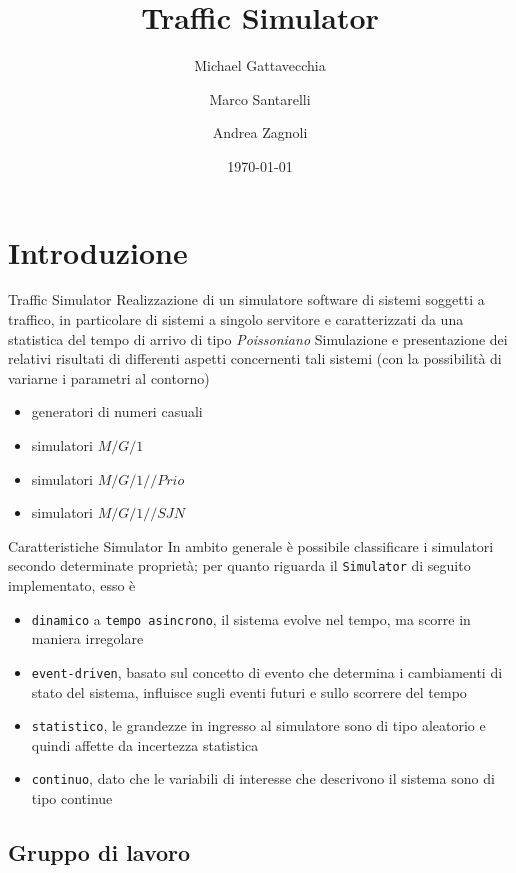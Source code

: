 \documentclass[slidestop,compress,mathserif]{beamer}
\title{Traffic Simulator}
\author{Michael Gattavecchia \and Marco Santarelli \and Andrea Zagnoli}
\date{\today}
\institute{{\rm ALMA MATER STUDIORUM\\
		II Facolt\`a di Ingegneria - Sede di Cesena\\
		Tecnologie e Sistemi per la Sicurezza}}
\begin{document}
\frame{\titlepage}
\setcounter{tocdepth}{1}
\tableofcontents
\section{Introduzione}

\begin{frame}{Traffic Simulator}
\vfill
Realizzazione di un simulatore software di sistemi soggetti a traffico, in particolare di sistemi a singolo servitore e caratterizzati da una statistica del tempo di arrivo di tipo \emph{Poissoniano}
\vfill
Simulazione e presentazione dei relativi risultati di differenti aspetti concernenti tali sistemi (con la possibilit\`a di variarne i parametri al contorno)
 \begin{itemize}
 	\footnotesize
	\item generatori di numeri casuali
	\item simulatori $M/G/1$
	\item simulatori $M/G/1//Prio$
	\item simulatori $M/G/1//SJN$
 \end{itemize}
 \vfill
\end{frame}

\begin{frame}{Caratteristiche Simulator}
\vfill
In ambito generale \`e possibile classificare i simulatori secondo determinate propriet\`a; per quanto riguarda il \texttt{Simulator} di seguito implementato, esso \`e
 \begin{itemize}
 	\footnotesize
	\item[\textbullet] {\tt dinamico} a {\tt tempo asincrono}, il sistema evolve nel tempo, ma scorre in maniera irregolare
	\item[\textbullet] {\tt event-driven}, basato sul concetto di evento che determina i cambiamenti di stato del sistema, influisce sugli eventi futuri e sullo scorrere del tempo
	\item[\textbullet] {\tt statistico}, le grandezze in ingresso al simulatore sono di tipo aleatorio e quindi affette da incertezza statistica
	\item[\textbullet] {\tt continuo}, dato che le variabili di interesse che descrivono il sistema sono di tipo continue
 \end{itemize}
 \vfill
\end{frame}


\subsection{Gruppo di lavoro}
\end{document}
